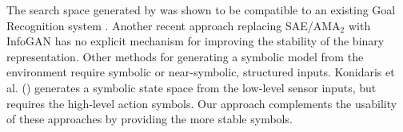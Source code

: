 The search space generated by \latentplanner was shown to be compatible
to an existing Goal Recognition system \cite{amado2018goal,amado2018goalb}.
% 
Another recent approach replacing SAE/AMA$_2$ with InfoGAN \cite{kurutach2018learning}
has no explicit mechanism for improving the stability of the binary representation.
% 
% 
Other methods for generating a symbolic model from the environment \cite{YangWJ07,CresswellMW13,MouraoZPS12}
require symbolic or near-symbolic, structured inputs.
% 
% 
Konidaris et al. (\citeyear{KonidarisKL18}) generates a symbolic state space from
the low-level sensor inputs, but requires the high-level action symbols.
% 
% 
Our approach complements the usability of these approaches by providing the more stable symbols.

% 

